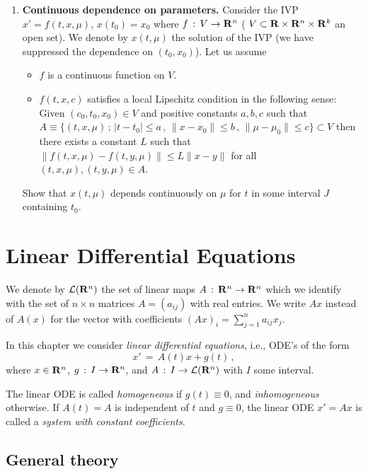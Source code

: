 \documentclass[12pt]{report}
\newcommand{\calL}{{\cal L}}
\newcommand{\bR}{{\bf R}}
\def\to{\rightarrow}
\begin{document}
\begin{enumerate}
\item {\bf Continuous dependence on parameters.}  Consider the IVP $x' = f(t,x,\mu)$, 
$x(t_0)=x_0$ where $f\,:\, V \to \bR^n$ ( $V \subset \bR\times\bR^n\times\bR^k$ an open set).  
We denote by $x(t,\mu)$ the solution of the IVP (we have suppressed the dependence on 
$(t_0,x_0)$).  Let us assume 
\begin{itemize}
\item $f$ is a continuous function on $V$.  
\item $f(t,x,c)$ satisfies a local Lipschitz condition in the following sense:  Given $(c_0, t_0, x_0) \in V$ 
and positive constants $a, b,c $ such that $A\equiv\{ (t,x,\mu)  \,;\,  |t-t_0| \le a \,,\, \|x -x_0\| \le b\,,\, \|\mu - \mu_0\|\le c \} \subset V$  then there exists a constant $L$ such that 
$\| f(t,x,\mu ) - f(t,y, \mu )\| \le L \| x-y\|$ for all $(t,x,\mu), (t,y,\mu)  \in A$. 
\end{itemize}
Show that $x(t,\mu)$ depends continuously on $\mu$ for $t$ in some interval $J$ containing $t_0$. 
 



\end{enumerate}



\chapter{Linear Differential Equations}
\thispagestyle{empty}

 
We denote by $\calL(\bR^n)$
the set of linear maps $A \,: \, \bR^n \to \bR^n$ which we identify with the set of 
$n \times n$ matrices $A=(a_{ij})$ with real entries.  We write $Ax$ instead of $A(x)$
for the vector with coefficients $(Ax)_i = \sum_{j=1}^n a_{ij}x_j$.   


In this chapter we consider {\em linear differential equations}, i.e.,  ODE's of the form
\begin{equation}\label{lineq}
x' \,=\, A(t) x + g(t)\,,
\end{equation}
where $x \in \bR^n$, $g\,:\, I \to \bR^n$, and $A \, :\, I \to \calL(\bR^n)$ with $I$ some interval.  


The linear ODE is called {\em homogeneous} if $g(t) \equiv 0$, and {\em
inhomogeneous} otherwise.  If $A(t)=A$ is independent of $t$ and
$g\equiv 0$, the linear ODE $x' = Ax$ is called a {\em system with
constant coefficients}.


\section{General theory} 
\end{document}

